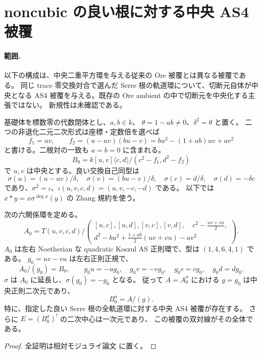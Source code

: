 \section{noncubic の良い根に対する中央 AS4 被覆}
\label{sec:noncubic-central-hull}

\paragraph{範囲.}
以下の構成は、中央二重平方環を与える従来の Ore 被覆とは異なる被覆である。
同じ trace 零交換対合で選んだ Serre 根の軌道環について、切断元自体が中央となる
AS4 被覆を与える。既存の Ore ambient の中で切断元を中央化する主張ではない。
新規性は未確認である。

基礎体を標数零の代数閉体とし、\(a,b\in k\)、
\(\theta=1-ab\ne0\)、\(\delta^2=\theta\) と置く。
二つの非退化二元二次形式は座標・定数倍を選べば
\[
 f_1=uv,\qquad f_2=(u-av)(bu-v)
       =bu^2-(1+ab)uv+av^2
\]
と書ける。二根対の一致も \(a=b=0\) に含まれる。
\[
 B_0=k[u,v]\langle c,d\rangle/(c^2-f_1,d^2-f_2)
\]
で \(u,v\) は中央とする。良い交換自己同型は
\[
 \sigma(u)=(u-av)/\delta,\quad
 \sigma(v)=(bu-v)/\delta,\quad
 \sigma(c)=d/\delta,\quad \sigma(d)=-\delta c
\]
であり、\(\sigma^2=\iota\)、\(\iota(u,v,c,d)=(u,v,-c,-d)\) である。
以下では \(x*y=x\sigma^{\deg x}(y)\) の Zhang 規約を使う。

\begin{theorem}\label{thm:noncubic-central-hull}
次の六関係環を定める。
\[
 A_0=T(u,v,c,d)\Big/
 \left(
 \begin{gathered}
 [u,c],[u,d],[v,c],[v,d],\quad c^2-\frac{uv+vu}{2},\\
 d^2-bu^2+\frac{1+ab}{2}(uv+vu)-av^2
 \end{gathered}
 \right).
\]
\(A_0\) は左右 Noetherian な quadratic Koszul AS 正則環で、型は
\((1,4,6,4,1)\) である。
\(g_0=uv-vu\) は左右正則正規で、
\[
 A_0/(g_0)=B_0,\qquad
 g_0u=-ug_0,\quad g_0v=-vg_0,\quad
 g_0c=cg_0,\quad g_0d=dg_0.
\]
\(\sigma\) は \(A_0\) に延長し、\(\sigma(g_0)=-g_0\) となる。
従って \(A=A_0^\sigma\) における \(g=g_0\) は中央正則二次元であり、
\[
 B_0^\sigma=A/(g).
\]
特に、指定した良い Serre 根の全軌道環に対する中央 AS4 被覆が存在する。
さらに \(E=(B_0^\sigma)^!\) の二次中心は一次元であり、
この被覆の双対線がその全体である。
\end{theorem}

\begin{proof}
全証明は相対モジュライ論文 \cite[\texttt{noncubic_central_hull}]{QuadricModuli2026} に置く。
\end{proof}

